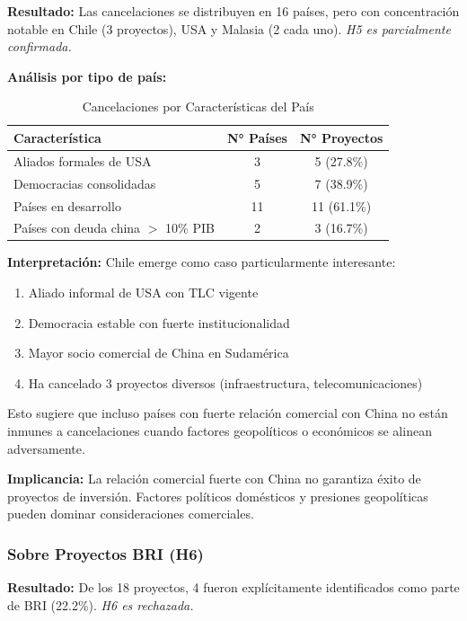 \documentclass[12pt]{article}
\begin{document}
\textbf{Resultado:} Las cancelaciones se distribuyen en 16 países, pero con concentración notable en Chile (3 proyectos), USA y Malasia (2 cada uno). \textit{H5 es parcialmente confirmada.}

\textbf{Análisis por tipo de país:}

\begin{table}[H]
\centering
\caption{Cancelaciones por Características del País}
\label{tab:geografia}
\begin{tabular}{lcc}
\toprule
\textbf{Característica} & \textbf{N° Países} & \textbf{N° Proyectos} \\
\midrule
Aliados formales de USA & 3 & 5 (27.8\%) \\
Democracias consolidadas & 5 & 7 (38.9\%) \\
Países en desarrollo & 11 & 11 (61.1\%) \\
Países con deuda china $>$ 10\% PIB & 2 & 3 (16.7\%) \\
\bottomrule
\end{tabular}
\end{table}

\textbf{Interpretación:} Chile emerge como caso particularmente interesante:
\begin{enumerate}
    \item Aliado informal de USA con TLC vigente
    \item Democracia estable con fuerte institucionalidad
    \item Mayor socio comercial de China en Sudamérica
    \item Ha cancelado 3 proyectos diversos (infraestructura, telecomunicaciones)
\end{enumerate}

Esto sugiere que incluso países con fuerte relación comercial con China no están inmunes a cancelaciones cuando factores geopolíticos o económicos se alinean adversamente.

\textbf{Implicancia:} La relación comercial fuerte con China no garantiza éxito de proyectos de inversión. Factores políticos domésticos y presiones geopolíticas pueden dominar consideraciones comerciales.

\subsubsection{Sobre Proyectos BRI (H6)}

\textbf{Resultado:} De los 18 proyectos, 4 fueron explícitamente identificados como parte de BRI (22.2\%). \textit{H6 es rechazada.}
\end{document}
